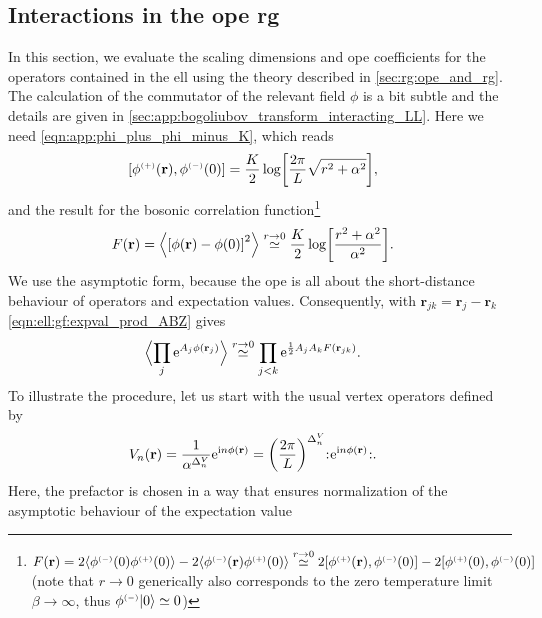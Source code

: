 \subsection{Interactions in the \texorpdfstring{\acrshort{ope}}{OPE} \texorpdfstring{\acrshort{rg}}{RG}}\label{sec:ell:rg:ope_vertex_operators}
In this section, we evaluate the scaling dimensions and \gls{ope} coefficients for the operators contained in the \gls{ell} using the theory described in \autoref{sec:rg:ope_and_rg}.
The calculation of the commutator of the relevant field $\phi$ is a bit subtle and the details are given in \autoref{sec:app:bogoliubov_transform_interacting_LL}.
Here we need \autoref{eqn:app:phi_plus_phi_minus_K}, which reads
\begin{align*}
\klb*{\phi\eplus(\textbf{r}), \phi\eminus(0)} &= \frac{K}{2} \log\klb*{\frac{2\pi}{L} \sqrt{r^2 + \alpha^2}},
\end{align*}
and the result for the bosonic correlation function\footnote{$F(\textbf{r}) =2 \bra*{\phi\eminus(0)\phi\eplus(0)} - 2\bra*{\phi\eminus(\textbf{r})\phi\eplus(0)} \asymeq{r\rightarrow 0} 2 \klb*{\phi\eplus(\textbf{r}), \phi\eminus(0)} - 2 \klb*{\phi\eplus(0), \phi\eminus(0)}$\\ (note that $r\rightarrow 0$ generically also corresponds to the zero temperature limit $\beta\rightarrow \infty$, thus $\phi\eminus \Ket{0} \simeq 0$)}
\begin{align}
F(\textbf{r}) &= \bra*{\klb*{\phi(\textbf{r}) - \phi(0)}^2} \asymeq{r\rightarrow 0} \frac{K}{2} \log\klb*{\frac{r^2 + \alpha^2}{\alpha^2}}. \label{eqn:ell:rg:F_r}
\end{align}
We use the asymptotic form, because the \gls{ope} is all about the short-distance behaviour of operators and expectation values.
Consequently, with $\textbf{r}_{jk} = \textbf{r}_j - \textbf{r}_k$ \autoref{eqn:ell:gf:expval_prod_ABZ} gives
\begin{align*}
\bra[\Big]{\prod_j \powe{ A_j \phi(\textbf{r}_j)}} &\asymeq{r\rightarrow 0} \prod_{j<k} \powe{\frac{1}{2} A_j A_k F(\textbf{r}_{jk})}.
\end{align*}
To illustrate the procedure, let us start with the usual vertex operators defined by
\begin{align}
V_n(\textbf{r}) &= \frac{1}{\alpha^{\Delta^V_n}} \powe{\i n\phi(\textbf{r})} = \kla*{\frac{2\pi}{L}}^{\Delta^V_n} \normord{\powe{\i n\phi(\textbf{r})}}. \label{eqn:ell:rg:vertex_operator_Vn_def}
\end{align}
Here, the prefactor is chosen in a way that ensures normalization of the asymptotic behaviour of the expectation value
